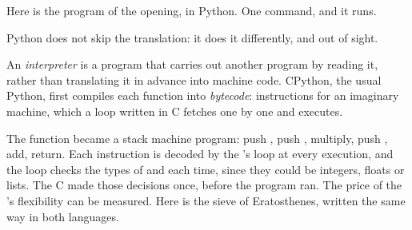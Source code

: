 Here is the program of the opening, in Python. One command, and it runs.



Python does not skip the translation: it does it differently, and out of sight.

\begin{definition}\label{def:b1:compilation-pipeline:interpreter}
An \emph{interpreter} is a program that carries out another program by reading it, rather
than translating it in advance into machine code. CPython, the usual Python, first compiles each function into
\emph{bytecode}: instructions for an imaginary machine, which a loop written in C fetches one by
one and executes.
\end{definition}


\label{out:b1:compilation-pipeline:bytecode}

The function became a stack machine program: push , push , multiply, push , add, return.
Each instruction is decoded by the 's loop at every execution, and the loop checks the types of
 and  each time, since they could be integers, floats or lists. The C  made those
decisions once, before the program ran. The price of the 's flexibility can be measured. Here is the
sieve of Eratosthenes, written the same way in both languages.

\label{lst:b1:compilation-pipeline:sieve}


